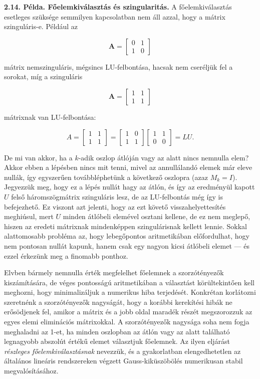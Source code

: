 \documentclass[
  magyar,
  11pt]{article}
\providecommand{\boldsymbol}[1]{\mathbf{#1}}
\begin{document}
\textbf{2.14. Példa. Főelemkiválasztás és szingularitás.} A
főelemkiválasztás esetleges szüksége semmilyen kapcsolatban nem áll
azzal, hogy a mátrix szinguláris-e. Például az

\[\boldsymbol{A} = \begin{bmatrix} 0 & 1 \\ 1 & 0 \end{bmatrix}\]

mátrix nemszinguláris, mégsincs LU-felbontása, hacsak nem cseréljük fel
a sorokat, míg a szinguláris

\[\boldsymbol{A} = \begin{bmatrix} 1 & 1 \\ 1 & 1 \end{bmatrix}\]

mátrixnak van LU-felbontása:

\[A = \begin{bmatrix} 1 & 1 \\ 1 & 1 \end{bmatrix} = \begin{bmatrix} 1 & 0 \\ 1 & 1 \end{bmatrix} \begin{bmatrix} 1 & 1 \\ 0 & 0 \end{bmatrix} = LU.\]

De mi van akkor, ha a \(k\)-adik oszlop átlóján vagy az alatt nincs
nemnulla elem? Akkor ebben a lépésben nincs mit tenni, mivel az
annullálandó elemek már eleve nullák, így egyszerűen továbbléphetünk a
következő oszlopra (azaz \(M_k = I\)). Jegyezzük meg, hogy ez a lépés
nullát hagy az átlón, és így az eredményül kapott \(U\) felső
háromszögmátrix szinguláris lesz, de az LU-felbontás még így is
befejezhető. Ez viszont azt jelenti, hogy az ezt követő
visszahelyettesítés meghiúsul, mert \(U\) minden átlóbeli elemével
osztani kellene, de ez nem meglepő, hiszen az eredeti mátrixnak
mindenképpen szingulárisnak kellett lennie. Sokkal alattomosabb probléma
az, hogy lebegőpontos aritmetikában előfordulhat, hogy nem pontosan
nullát kapunk, hanem csak egy nagyon kicsi átlóbeli elemet --- és ezzel
érkezünk meg a finomabb ponthoz.

Elvben bármely nemnulla érték megfelelhet főelemnek a szorzótényezők
kiszámítására, de véges pontosságú aritmetikában a választást
körültekintően kell meghozni, hogy minimalizáljuk a numerikus hiba
terjedését. Konkrétan korlátozni szeretnénk a szorzótényezők nagyságát,
hogy a korábbi kerekítési hibák ne erősödjenek fel, amikor a mátrix és a
jobb oldal maradék részét megszorozzuk az egyes elemi eliminációs
mátrixokkal. A szorzótényezők nagysága soha nem fogja meghaladni az
1-et, ha minden oszlopban az átlón vagy az alatt található legnagyobb
abszolút értékű elemet választjuk főelemnek. Az ilyen eljárást
\emph{részleges főelemkiválasztásnak} nevezzük, és a gyakorlatban
elengedhetetlen az általános lineáris rendszereken végzett
Gauss-kiküszöbölés numerikusan stabil megvalósításához.
\end{document}

